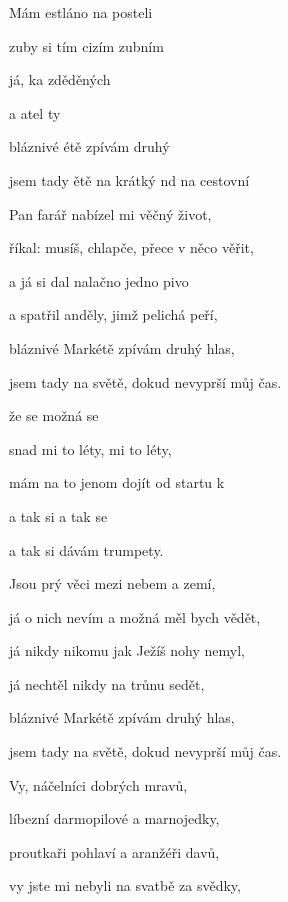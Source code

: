 

\zs
Mám estláno na posteli 

zuby si tím cizím zubním 

já, ka zděděných 

a atel ty 

bláznivé étě zpívám druhý 

jsem tady ětě na krátký nd na cestovní  
  
\ks

\zs
Pan farář nabízel mi věčný život,

říkal: musíš, chlapče, přece v něco věřit,

a já si dal nalačno jedno pivo

a spatřil anděly, jimž pelichá peří,

bláznivé Markétě zpívám druhý hlas,

jsem tady na světě, dokud nevyprší můj čas.
\ks

\zr
{} že se  možná se 

snad mi to  léty,  mi to  léty,

mám na to jenom  dojít od startu k 

a tak si  a tak se 

a tak si dávám  trumpety.   
\kr

\zs
Jsou prý věci mezi nebem a zemí,

já o nich nevím a možná měl bych vědět,

já nikdy nikomu jak Ježíš nohy nemyl,

já nechtěl nikdy na trůnu sedět,

bláznivé Markétě zpívám druhý hlas,

jsem tady na světě, dokud nevyprší můj čas.
\ks

\zs
Vy, náčelníci dobrých mravů,

líbezní darmopilové a marnojedky,

proutkaři pohlaví a aranžéři davů,

vy jste mi nebyli na svatbě za svědky,

